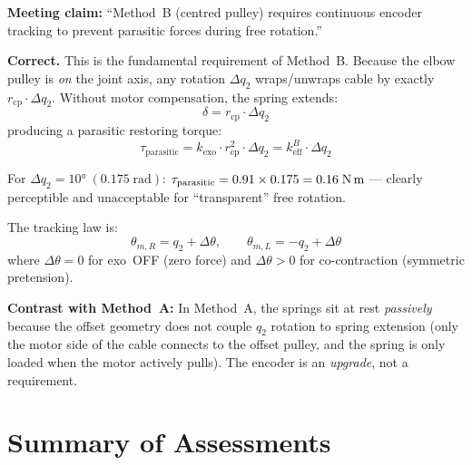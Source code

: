 \documentclass[11pt, a4paper]{article}
\newenvironment{correct}{%
  \begin{mdframed}[backgroundcolor=green!8, linecolor=green!50!black]%
  \textbf{\color{green!50!black}\checkmark\; Correct.}\;}{\end{mdframed}}
\begin{document}
\noindent
\textbf{Meeting claim:} ``Method~B (centred pulley) requires continuous
encoder tracking to prevent parasitic forces during free rotation.''

\begin{correct}
This is the fundamental requirement of Method~B.  Because the elbow pulley
is \emph{on} the joint axis, any rotation $\Delta q_2$ wraps/unwraps cable
by exactly $r_{\text{cp}} \cdot \Delta q_2$.  Without motor compensation,
the spring extends:
%
\begin{equation}
  \delta = r_{\text{cp}} \cdot \Delta q_2
\end{equation}
%
producing a parasitic restoring torque:
\begin{equation}
  \tau_{\text{parasitic}}
  = k_{\text{exo}} \cdot r_{\text{cp}}^2 \cdot \Delta q_2
  = k_{\text{eff}}^B \cdot \Delta q_2
\end{equation}

For $\Delta q_2 = 10°\;(0.175\;\text{rad})$:
$\tau_{\text{parasitic}} = 0.91 \times 0.175 = 0.16\;\text{N\,m}$
--- clearly perceptible and unacceptable for ``transparent'' free rotation.

\medskip\noindent
The tracking law is:
\begin{equation}
  \theta_{m,R} = q_2 + \Delta\theta, \qquad
  \theta_{m,L} = -q_2 + \Delta\theta
\end{equation}
where $\Delta\theta = 0$ for exo~OFF (zero force) and
$\Delta\theta > 0$ for co-contraction (symmetric pretension).

\medskip\noindent
\textbf{Contrast with Method~A:}
In Method~A, the springs sit at rest \emph{passively} because the offset
geometry does not couple $q_2$ rotation to spring extension (only the motor
side of the cable connects to the offset pulley, and the spring is only
loaded when the motor actively pulls).  The encoder is an \emph{upgrade},
not a requirement.
\end{correct}


\section{Summary of Assessments}
\label{sec:summary}
\end{document}
